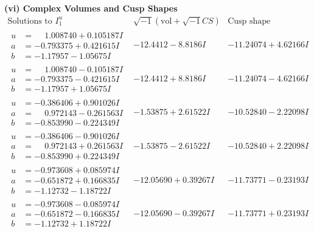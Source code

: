\documentclass[1p]{elsarticle_modified}
\theoremstyle{definition}
\newcommand{\I}{\sqrt{-1}}
\begin{document}
\newpage\flushleft \textbf{(vi) Complex Volumes and Cusp Shapes}
$$\begin{array}{c|c|c}  
\text{Solutions to }I^u_{1}& \I (\text{vol} + \sqrt{-1}CS) & \text{Cusp shape}\\
 \hline 
\begin{aligned}
u &= \phantom{-}1.008740 + 0.105187 I \\
a &= -0.793375 + 0.421615 I \\
b &= -1.17957 - 1.05675 I\end{aligned}
 & -12.4412 - 8.8186 I & -11.24074 + 4.62166 I \\ \hline\begin{aligned}
u &= \phantom{-}1.008740 - 0.105187 I \\
a &= -0.793375 - 0.421615 I \\
b &= -1.17957 + 1.05675 I\end{aligned}
 & -12.4412 + 8.8186 I & -11.24074 - 4.62166 I \\ \hline\begin{aligned}
u &= -0.386406 + 0.901026 I \\
a &= \phantom{-}0.972143 - 0.261563 I \\
b &= -0.853990 - 0.224349 I\end{aligned}
 & -1.53875 + 2.61522 I & -10.52840 - 2.22098 I \\ \hline\begin{aligned}
u &= -0.386406 - 0.901026 I \\
a &= \phantom{-}0.972143 + 0.261563 I \\
b &= -0.853990 + 0.224349 I\end{aligned}
 & -1.53875 - 2.61522 I & -10.52840 + 2.22098 I \\ \hline\begin{aligned}
u &= -0.973608 + 0.085974 I \\
a &= -0.651872 + 0.166835 I \\
b &= -1.12732 - 1.18722 I\end{aligned}
 & -12.05690 + 0.39267 I & -11.73771 - 0.23193 I \\ \hline\begin{aligned}
u &= -0.973608 - 0.085974 I \\
a &= -0.651872 - 0.166835 I \\
b &= -1.12732 + 1.18722 I\end{aligned}
 & -12.05690 - 0.39267 I & -11.73771 + 0.23193 I \\ \hline\begin{aligned}

\end{aligned}
\end{array}$$
\end{document}
